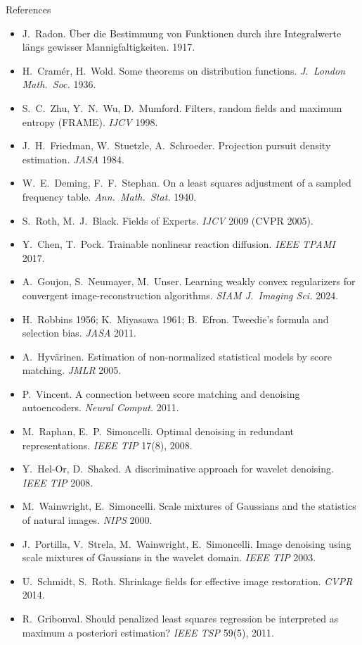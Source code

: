\documentclass[10pt,aspectratio=169]{beamer}
\begin{document}
\begin{frame}[allowframebreaks]{References}
\footnotesize
\begin{itemize}
\item J.~Radon. \"Uber die Bestimmung von Funktionen durch ihre Integralwerte l\"angs gewisser Mannigfaltigkeiten. 1917.
\item H.~Cram\'er, H.~Wold. Some theorems on distribution functions. \emph{J.\ London Math.\ Soc.} 1936.
\item S.~C.~Zhu, Y.~N.~Wu, D.~Mumford. Filters, random fields and maximum entropy (FRAME). \emph{IJCV} 1998.
\item J.~H.~Friedman, W.~Stuetzle, A.~Schroeder. Projection pursuit density estimation. \emph{JASA} 1984.
\item W.~E.~Deming, F.~F.~Stephan. On a least squares adjustment of a sampled frequency table. \emph{Ann.\ Math.\ Stat.} 1940.
\item S.~Roth, M.~J.~Black. Fields of Experts. \emph{IJCV} 2009 (CVPR 2005).
\item Y.~Chen, T.~Pock. Trainable nonlinear reaction diffusion. \emph{IEEE TPAMI} 2017.
\item A.~Goujon, S.~Neumayer, M.~Unser. Learning weakly convex regularizers for convergent
      image-reconstruction algorithms. \emph{SIAM J.\ Imaging Sci.} 2024.
\item H.~Robbins 1956; K.~Miyasawa 1961; B.~Efron. Tweedie's formula and selection bias. \emph{JASA} 2011.
\item A.~Hyv\"arinen. Estimation of non-normalized statistical models by score matching. \emph{JMLR} 2005.
\item P.~Vincent. A connection between score matching and denoising autoencoders. \emph{Neural Comput.} 2011.
\item M.~Raphan, E.~P.~Simoncelli. Optimal denoising in redundant representations. \emph{IEEE TIP} 17(8), 2008.
\item Y.~Hel-Or, D.~Shaked. A discriminative approach for wavelet denoising. \emph{IEEE TIP} 2008.
\item M.~Wainwright, E.~Simoncelli. Scale mixtures of Gaussians and the statistics of natural images. \emph{NIPS} 2000.
\item J.~Portilla, V.~Strela, M.~Wainwright, E.~Simoncelli. Image denoising using scale mixtures of Gaussians in the wavelet domain. \emph{IEEE TIP} 2003.
\item U.~Schmidt, S.~Roth. Shrinkage fields for effective image restoration. \emph{CVPR} 2014.
\item R.~Gribonval. Should penalized least squares regression be interpreted as maximum a posteriori estimation? \emph{IEEE TSP} 59(5), 2011.

\end{itemize}
\end{frame}
\end{document}
